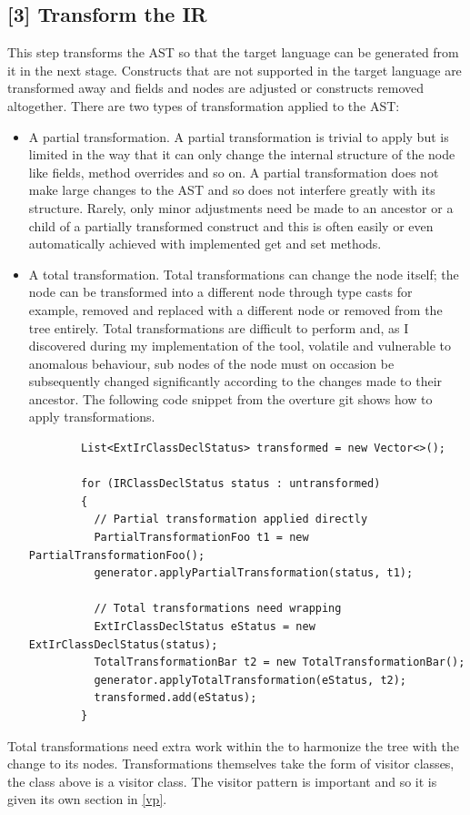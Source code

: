 	\subsection{	[3] Transform the IR} \label{ttir}
	This step transforms the AST so that the target language can be generated from it in the next stage. Constructs that are not supported in the target language are transformed away and fields and nodes are adjusted or constructs removed altogether. There are two types of transformation applied to the AST: 
   	\begin{itemize}
	   \item A partial transformation. A partial transformation is trivial to apply but is limited in the way that it can only change the internal structure of the node like fields, method overrides and so on. A partial transformation does not make large changes to the AST and so does not interfere greatly with its structure. Rarely, only minor adjustments need be made to an ancestor or a child of a partially transformed construct and this is often easily or even automatically achieved with implemented get and set methods.
	   \item A total transformation. Total transformations can change the node itself; the node can be transformed into a different node through type casts for example, removed and replaced with a different node or removed from the tree entirely. Total transformations are difficult to perform and, as I discovered during my implementation of the tool, volatile and vulnerable to anomalous behaviour, sub nodes of the node must on occasion be subsequently changed significantly according to the changes made to their ancestor. The following code snippet from the overture git shows how to apply transformations.
	   \begin{lstlisting}
	   	List<ExtIrClassDeclStatus> transformed = new Vector<>();

		for (IRClassDeclStatus status : untransformed)
		{
		  // Partial transformation applied directly
		  PartialTransformationFoo t1 = new PartialTransformationFoo();
		  generator.applyPartialTransformation(status, t1);

		  // Total transformations need wrapping
		  ExtIrClassDeclStatus eStatus = new ExtIrClassDeclStatus(status);
		  TotalTransformationBar t2 = new TotalTransformationBar();
		  generator.applyTotalTransformation(eStatus, t2);
		  transformed.add(eStatus);
		}
	  	\end{lstlisting}\parencite{vdmwikicgp}
 	\end{itemize}
	Total transformations need extra work within the  to harmonize the tree with the change to its nodes. Transformations themselves take the form of visitor classes, the  class above is a visitor class. The visitor pattern is important and so it is given its own section in \ref{vp}.
